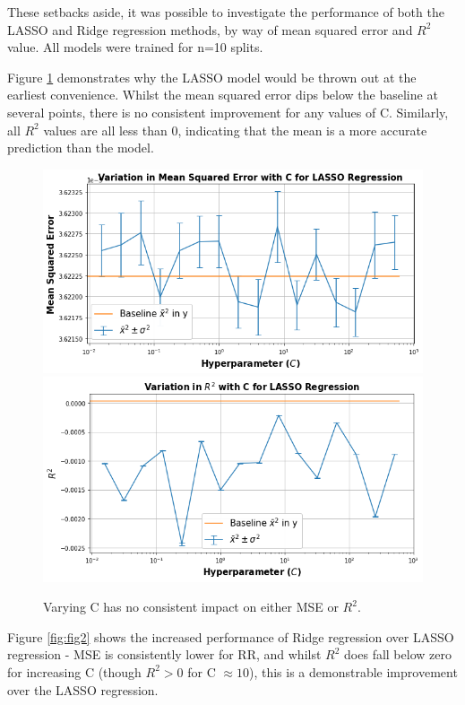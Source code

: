 These setbacks aside, it was possible to investigate the performance of both the LASSO and Ridge regression methods, by way of mean squared error and $R^2$ value. All models were trained for n=10 splits.
\vspace{8pt}

Figure \ref{fig:fig1} demonstrates why the LASSO model would be thrown out at the earliest convenience. Whilst the mean squared error dips below the baseline at several points, there is no consistent improvement for any values of C. Similarly, all $R^{2}$ values are all less than 0, indicating that the mean is a more accurate prediction than the model.

\begin{figure}[!h]
\begin{small}
\centering
\linespread{1.0}
\includegraphics[width=0.8\linewidth]{pics/Lasso_MSE.png}
\includegraphics[width=0.8\linewidth]{pics/Lasso_R2.png}
\caption{Varying C has no consistent impact on either MSE or $R^2$.}
\label{fig:fig1}
\end{small}
\end{figure}

Figure \ref{fig:fig2} shows the increased performance of Ridge regression over LASSO regression - MSE is consistently lower for RR, and whilst $R^2$ does fall below zero for increasing C (though $R^2 > 0$ for C $\approx 10$), this is a demonstrable improvement over the LASSO regression. 

